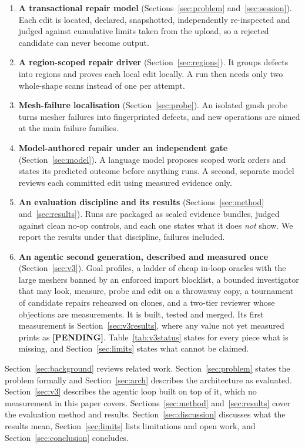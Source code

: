 \documentclass[11pt,onecolumn]{article}
\begin{document}
\begin{enumerate}
  \item \textbf{A transactional repair model} (Sections~\ref{sec:problem} and~\ref{sec:session}).
        Each edit is located, declared, snapshotted, independently re-inspected and judged against
        cumulative limits taken from the upload, so a rejected candidate can never become output.
  \item \textbf{A region-scoped repair driver} (Section~\ref{sec:regions}). It groups defects into
        regions and proves each local edit locally. A run then needs only two whole-shape scans
        instead of one per attempt.
  \item \textbf{Mesh-failure localisation} (Section~\ref{sec:probe}). An isolated gmsh probe turns
        mesher failures into fingerprinted defects, and new operations are aimed at the main failure
        families.
  \item \textbf{Model-authored repair under an independent gate} (Section~\ref{sec:model}). A
        language model proposes scoped work orders and states its predicted outcome before anything
        runs. A second, separate model reviews each committed edit using measured evidence only.
  \item \textbf{An evaluation discipline and its results} (Sections~\ref{sec:method}
        and~\ref{sec:results}). Runs are packaged as sealed evidence bundles, judged against clean
        no-op controls, and each one states what it does \emph{not} show. We report the results
        under that discipline, failures included.
  \item \textbf{An agentic second generation, described and measured once}
        (Section~\ref{sec:v3}). Goal profiles, a ladder of cheap in-loop oracles with the large
        meshers banned by an enforced import blocklist, a bounded investigator that may look,
        measure, probe and edit on a throwaway copy, a tournament of candidate repairs rehearsed on
        clones, and a two-tier reviewer whose objections are measurements. It is built, tested and
        merged. Its first measurement is Section~\ref{sec:v3results}, where any value not yet
        measured prints as \textbf{[PENDING]}. Table~\ref{tab:v3status} states for every piece what
        is missing, and Section~\ref{sec:limits} states what cannot be claimed.
\end{enumerate}

Section~\ref{sec:background} reviews related work. Section~\ref{sec:problem} states the problem
formally and Section~\ref{sec:arch} describes the architecture as evaluated.
Section~\ref{sec:v3} describes the agentic loop built on top of it, which no measurement in this
paper covers. Sections~\ref{sec:method} and~\ref{sec:results} cover the evaluation method and
results. Section~\ref{sec:discussion}
discusses what the results mean, Section~\ref{sec:limits} lists limitations and open work, and
Section~\ref{sec:conclusion} concludes.
\end{document}
